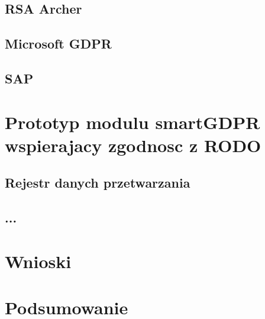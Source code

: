 \documentclass[en, noamssymb]{mgr}
\begin{document}
\section{RSA Archer}
\section{Microsoft GDPR}
\section{SAP}

\chapter{Prototyp modulu smartGDPR wspierajacy zgodnosc z RODO} \label{sec:sekcjaOpisPrototypu}
\section{Rejestr danych przetwarzania}
\section{...}

\chapter{Wnioski} \label{sec:sekcjaWnioski}

\chapter{Podsumowanie}
\label{sec:Podsumowanie}

\end{document}

